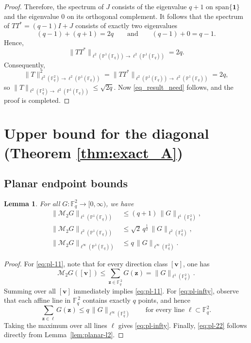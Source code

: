 \documentclass[11pt]{article}
\newtheorem{lemma}[theorem]{Lemma}
\newcommand{\F}{\mathbb{F}}
\newcommand{\1}{\mathbf 1}
\begin{document}
\begin{proof}
Therefore, the spectrum of $J$ consists of the eigenvalue $q+1$ on $\mathrm{span}\{\mathbf{1}\}$ and the eigenvalue $0$ on its orthogonal complement.
It follows that the spectrum of $TT^*=(q-1)I+J$ consists of exactly two eigenvalues
\[
(q-1)+(q+1)=2q
\qquad\text{and}\qquad
(q-1)+0=q-1.
\]
Hence,
\[
\|TT^\ast\|_{\ell^2(\mathbb{P}^1(\mathbb{F}_q))\to \ell^2(\mathbb{P}^1(\mathbb{F}_q))}=2q.
\]
Consequently,
\[
\|T\|_{\ell^2(\mathbb{F}_q^2)\to \ell^2(\mathbb{P}^1(\mathbb{F}_q))}^2
=
\|TT^\ast\|_{\ell^2(\mathbb{P}^1(\mathbb{F}_q))\to \ell^2(\mathbb{P}^1(\mathbb{F}_q))}
=
2q,
\]
so $\|T\|_{\ell^2(\mathbb{F}^2_q)\to \ell^2(\mathbb{P}^1(\F_q))}\le \sqrt{2q}$. Now \eqref{eq_result_need} follows, and the proof is completed. 
\end{proof}



\section{Upper bound for the diagonal (Theorem \ref{thm:exact_A})}\label{section3}

\subsection{Planar endpoint bounds}

\begin{lemma}
\label{lem:planar-endpoints}
For all $G:\mathbb{F}_q^2\to[0,\infty)$, we have
\begin{align}
\|\mathcal{M}_{2}G\|_{\ell^1(\mathbb{P}^1(\mathbb{F}_q))} &\le (q+1)\,\|G\|_{\ell^1(\mathbb{F}_q^2)},\label{eq:pl-11}\\
\|\mathcal{M}_{2}G\|_{\ell^2(\mathbb{P}^1(\mathbb{F}_q))} &\le \sqrt{2}\,q^{\frac{1}{2}}\,\|G\|_{\ell^2(\mathbb{F}_q^2)},\label{eq:pl-22}\\
\|\mathcal{M}_{2}G\|_{\ell^\infty(\mathbb{P}^1(\mathbb{F}_q))} &\le q\,\|G\|_{\ell^\infty(\mathbb{F}_q^2)}.\label{eq:pl-infty}
\end{align}
\end{lemma}

\begin{proof}
For \eqref{eq:pl-11}, note that for every direction class $[\mathbf{v}]$, one has
\[
\mathcal{M}_{2} G([\mathbf{v}])
    \le \sum_{\mathbf{z}\in\mathbb{F}_q^{\,2}} G(\mathbf{z})
    = \|G\|_{\ell^{1}(\mathbb{F}_q^{2})}.
\]
Summing over all $[\mathbf{v}]$ immediately implies \eqref{eq:pl-11}. For \eqref{eq:pl-infty}, observe that each affine line in $\mathbb{F}_q^{\,2}$ contains exactly $q$ points, and hence
\[
\sum_{\mathbf{z}\in\ell} G(\mathbf{z})
    \le q\,\|G\|_{\ell^{\infty}(\mathbb{F}_q^{2})}
    \qquad \text{for every line } \ell \subset \mathbb{F}_q^2.
\]
Taking the maximum over all lines $\ell$ gives \eqref{eq:pl-infty}. Finally, \eqref{eq:pl-22} follows directly from Lemma~\ref{lem:planar-l2}.
\end{proof}
\end{document}
